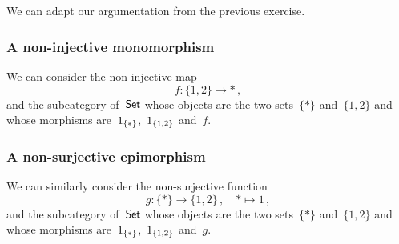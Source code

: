 \subsection{}

We can adapt our argumentation from the previous exercise.



\subsubsection*{A non-injective monomorphism}

We can consider the non-injective map
\[
	f \colon \{ 1, 2 \} \to \ast \,,
\]
and the subcategory of~$\mathsf{Set}$ whose objects are the two sets~$\{ \ast \}$ and~$\{ 1, 2 \}$ and whose morphisms are~$1_{\{ \ast \}}$,~$1_{\{ 1, 2 \}}$ and~$f$.



\subsubsection*{A non-surjective epimorphism}

We can similarly consider the non-surjective function
\[
	g
	\colon
	\{ \ast \} \to \{ 1, 2 \} \,,
	\quad
	\ast \mapsto 1 \,,
\]
and the subcategory of~$\mathsf{Set}$ whose objects are the two sets~$\{ \ast \}$ and~$\{ 1, 2 \}$ and whose morphisms are~$1_{\{ \ast \}}$,~$1_{\{ 1, 2 \}}$ and~$g$.
